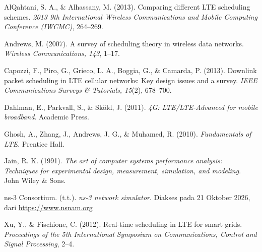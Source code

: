 \begin{pustaka}
AlQahtani, S. A., \& Alhassany, M. (2013). Comparing different LTE scheduling schemes. \textit{2013 9th International Wireless Communications and Mobile Computing Conference (IWCMC)}, 264--269.

Andrews, M. (2007). A survey of scheduling theory in wireless data networks. \textit{Wireless Communications, 143}, 1--17.

Capozzi, F., Piro, G., Grieco, L. A., Boggia, G., \& Camarda, P. (2013). Downlink packet scheduling in LTE cellular networks: Key design issues and a survey. \textit{IEEE Communications Surveys \& Tutorials, 15}(2), 678--700.

Dahlman, E., Parkvall, S., \& Sk\"{o}ld, J. (2011). \textit{4G: LTE/LTE-Advanced for mobile broadband}. Academic Press.

Ghosh, A., Zhang, J., Andrews, J. G., \& Muhamed, R. (2010). \textit{Fundamentals of LTE}. Prentice Hall.

Jain, R. K. (1991). \textit{The art of computer systems performance analysis: Techniques for experimental design, measurement, simulation, and modeling}. John Wiley \& Sons.

ns-3 Consortium. (t.t.). \textit{ns-3 network simulator}. Diakses pada 21 Oktober 2026, dari \url{https://www.nsnam.org}

Xu, Y., \& Fischione, C. (2012). Real-time scheduling in LTE for smart grids. \textit{Proceedings of the 5th International Symposium on Communications, Control and Signal Processing}, 2--4.
\end{pustaka}
